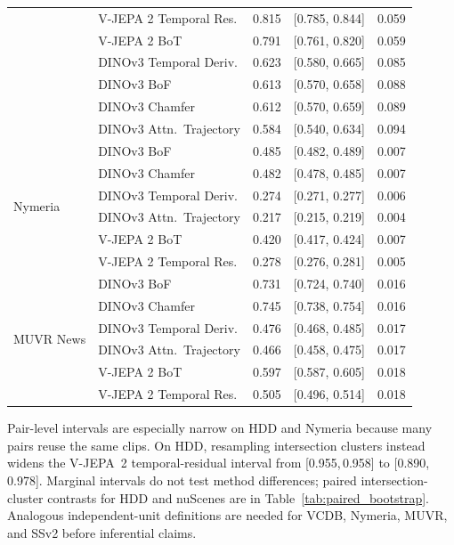 \documentclass{article}
\theoremstyle{remark}
\begin{document}
\begin{table}[h]
\begin{tabular}{llccc}
 & V-JEPA 2 Temporal Res.   & 0.815 & [0.785, 0.844] & 0.059 \\
 & V-JEPA 2 BoT             & 0.791 & [0.761, 0.820] & 0.059 \\
 & DINOv3 Temporal Deriv.   & 0.623 & [0.580, 0.665] & 0.085 \\
 & DINOv3 BoF               & 0.613 & [0.570, 0.658] & 0.088 \\
 & DINOv3 Chamfer           & 0.612 & [0.570, 0.659] & 0.089 \\
 & DINOv3 Attn.\ Trajectory & 0.584 & [0.540, 0.634] & 0.094 \\
\midrule
\multirow{6}{*}{Nymeria}
 & DINOv3 BoF               & 0.485 & [0.482, 0.489] & 0.007 \\
 & DINOv3 Chamfer           & 0.482 & [0.478, 0.485] & 0.007 \\
 & DINOv3 Temporal Deriv.   & 0.274 & [0.271, 0.277] & 0.006 \\
 & DINOv3 Attn.\ Trajectory & 0.217 & [0.215, 0.219] & 0.004 \\
 & V-JEPA 2 BoT             & 0.420 & [0.417, 0.424] & 0.007 \\
 & V-JEPA 2 Temporal Res.   & 0.278 & [0.276, 0.281] & 0.005 \\
\midrule
\multirow{6}{*}{MUVR News}
 & DINOv3 BoF               & 0.731 & [0.724, 0.740] & 0.016 \\
 & DINOv3 Chamfer           & 0.745 & [0.738, 0.754] & 0.016 \\
 & DINOv3 Temporal Deriv.   & 0.476 & [0.468, 0.485] & 0.017 \\
 & DINOv3 Attn.\ Trajectory & 0.466 & [0.458, 0.475] & 0.017 \\
 & V-JEPA 2 BoT             & 0.597 & [0.587, 0.605] & 0.018 \\
 & V-JEPA 2 Temporal Res.   & 0.505 & [0.496, 0.514] & 0.018 \\
\bottomrule
\end{tabular}
\begin{flushleft}
\small Pair-level intervals are especially narrow on HDD and Nymeria because many pairs reuse the same clips. On HDD, resampling intersection clusters instead widens the V-JEPA~2 temporal-residual interval from [0.955,\,0.958] to [0.890,\,0.978]. Marginal intervals do not test method differences; paired intersection-cluster contrasts for HDD and nuScenes are in Table~\ref{tab:paired_bootstrap}. Analogous independent-unit definitions are needed for VCDB, Nymeria, MUVR, and SSv2 before inferential claims.
\end{flushleft}
\end{table}
\end{document}
